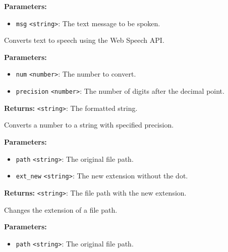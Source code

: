 \documentclass[12pt,a4paper]{article}
\begin{document}
\noindent \textbf{Parameters:}
\begin{itemize}
  \item \texttt{msg} \texttt{<string>}: The text message to be spoken.
\end{itemize}

\noindent Converts text to speech using the Web Speech API.

\vspace{5mm}
\noindent {}


\noindent \textbf{Parameters:}
\begin{itemize}
  \item \texttt{num} \texttt{<number>}: The number to convert.
  \item \texttt{precision} \texttt{<number>}: The number of digits after the decimal point.
\end{itemize}

\noindent \textbf{Returns:} \texttt{<string>}: The formatted string.

\noindent Converts a number to a string with specified precision.

\vspace{5mm}
\noindent {}


\noindent \textbf{Parameters:}
\begin{itemize}
  \item \texttt{path} \texttt{<string>}: The original file path.
  \item \texttt{ext\_new} \texttt{<string>}: The new extension without the dot.
\end{itemize}

\noindent \textbf{Returns:} \texttt{<string>}: The file path with the new extension.

\noindent Changes the extension of a file path.

\vspace{5mm}
\noindent {}


\noindent \textbf{Parameters:}
\begin{itemize}
  \item \texttt{path} \texttt{<string>}: The original file path.
\end{itemize}
\end{document}
